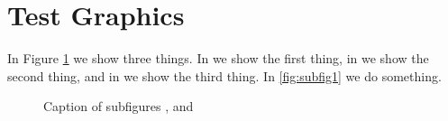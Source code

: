 \documentclass[10pt]{article}
\begin{document}
\section{Test Graphics}

In Figure \ref{fig:subfigureExample} we show three things. In  we show the first thing, in  we show the second thing, and in  we show the third thing. In \ref{fig:subfig1} we do something.
\begin{figure}[ht!]
\centering
{}
\caption[Optional caption for list of figures]{Caption of subfigures ,  and }
\label{fig:subfigureExample}
\end{figure}
\end{document}
